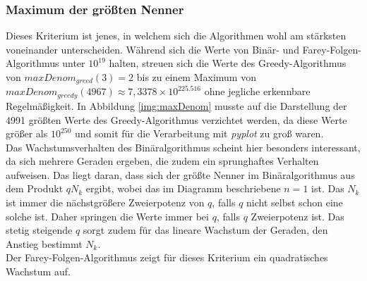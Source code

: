 \subsubsection{Maximum der größten Nenner}
Dieses Kriterium ist jenes, in welchem sich die Algorithmen wohl am stärksten voneinander unterscheiden. Während sich die Werte von Binär- und Farey-Folgen-Algorithmus unter $10^{19}$ halten, streuen sich die Werte des Greedy-Algorithmus von $maxDenom_{greed}(3) = 2$ bis zu einem Maximum von $maxDenom_{greedy}(4967) \approx 7,3378 \times 10^{225.516}$ ohne jegliche erkennbare Regelmäßigkeit. In Abbildung \ref{img:maxDenom} musste auf die Darstellung der 4991 größten Werte des Greedy-Algorithmus verzichtet werden, da diese Werte größer als $10^{250}$ und somit für die Verarbeitung mit \emph{pyplot} zu groß waren.\\
Das Wachstumsverhalten des Binäralgorithmus scheint hier besonders interessant, da sich mehrere Geraden ergeben, die zudem ein sprunghaftes Verhalten aufweisen. Das liegt daran, dass sich der größte Nenner im Binäralgorithmus aus dem Produkt $qN_k$ ergibt, wobei das im Diagramm beschriebene $n=1$ ist. Das $N_k$ ist immer die nächstgrößere Zweierpotenz von $q$, falls $q$ nicht selbst schon eine solche ist. Daher springen die Werte immer bei $q$, falls $q$ Zweierpotenz ist. Das stetig steigende $q$ sorgt zudem für das lineare Wachstum der Geraden, den Anstieg bestimmt $N_k$.\\
Der Farey-Folgen-Algorithmus zeigt für dieses Kriterium ein quadratisches Wachstum auf.


